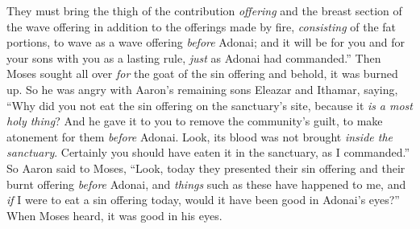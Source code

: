 \begin{biblechapter}
\verse They must bring the thigh of the contribution \textit{offering} and the breast section of the wave offering in addition to the offerings made by fire, \textit{consisting} of the fat portions, to wave as a wave offering \textit{before} Adonai; and it will be for you and for your sons with you as a lasting rule, \textit{just} as Adonai had commanded.”
 Then Moses sought all over \textit{for} the goat of the sin offering and behold, it was burned up. So he was angry with Aaron’s remaining sons Eleazar and Ithamar, saying,
\verse “Why did you not eat the sin offering on the sanctuary’s site, because it \textit{is} \textit{a most holy thing}? And he gave it to you to remove the community’s guilt, to make atonement for them \textit{before} Adonai.
\verse Look, its blood was not brought \textit{inside the sanctuary}. Certainly you should have eaten it in the sanctuary, as I commanded.”
\verse So Aaron said to Moses, “Look, today they presented their sin offering and their burnt offering \textit{before} Adonai, and \textit{things} such as these have happened to me, and \textit{if} I were to eat a sin offering today, would it have been good in Adonai’s eyes?”
\verse When Moses heard, it was good in his eyes.
\end{biblechapter}

